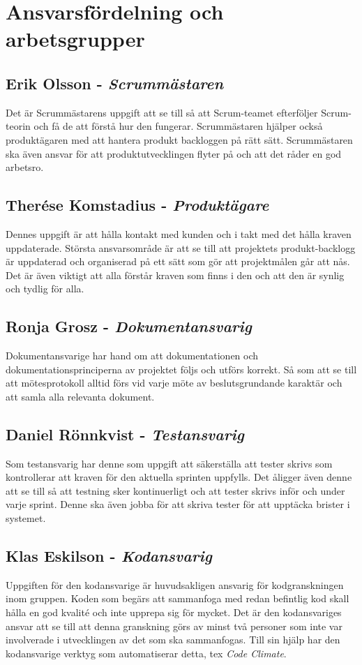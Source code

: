 \documentclass[a4paper,12pt,oneside,final]{extbook}
\begin{document}
\section{Ansvarsfördelning och arbetsgrupper}
  \subsection{Erik Olsson - \emph{Scrummästaren}}
  Det är Scrummästarens uppgift att se till så att Scrum-teamet
  efterföljer Scrum-teorin och få de att förstå hur den fungerar.
  Scrummästaren hjälper också produktägaren med att hantera produkt
  backloggen på rätt sätt. Scrummästaren ska även ansvar för att
  produktutvecklingen flyter på och att det råder en god arbetsro.

  \subsection{Therése Komstadius - \emph{Produktägare}}
  Dennes uppgift är att hålla kontakt med kunden och i takt med
  det hålla kraven uppdaterade. Största ansvarsområde är att se
  till att projektets produkt-backlogg är uppdaterad och organiserad
  på ett sätt som gör att projektmålen går att nås. Det är även
  viktigt att alla förstår kraven som finns i den och att den är
  synlig och tydlig för alla.

  \subsection{Ronja Grosz  - \emph{Dokumentansvarig}}
  Dokumentansvarige har hand om att dokumentationen och
  dokumentationsprinciperna av projektet följs och utförs korrekt.
  Så som att se till att mötesprotokoll alltid förs vid varje möte
  av beslutsgrundande karaktär och att samla alla relevanta dokument.

  \subsection{Daniel Rönnkvist - \emph{Testansvarig}}
  Som testansvarig har denne som uppgift att säkerställa att tester
  skrivs som kontrollerar att kraven för den aktuella sprinten uppfylls.
  Det åligger även denne att se till så att testning sker
  kontinuerligt och att tester skrivs inför och under varje sprint.
  Denne ska även jobba för att skriva tester för att upptäcka brister
  i systemet.

  \subsection{Klas Eskilson  - \emph{Kodansvarig}}
  Uppgiften för den kodansvarige är huvudsakligen ansvarig för
  kodgranskningen inom gruppen. Koden som begärs att sammanfoga med
  redan befintlig kod skall hålla en god kvalité och inte upprepa
  sig för mycket. Det är den kodansvariges ansvar att se till att
  denna granskning görs av minst två personer som inte var involverade
  i utvecklingen av det som ska sammanfogas. Till sin hjälp har den
  kodansvarige verktyg som automatiserar detta, tex \emph{Code Climate}.
\end{document}

